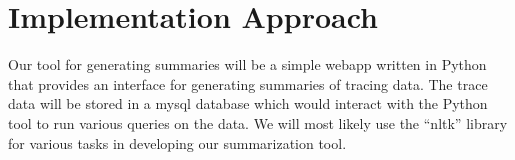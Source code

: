\section{Implementation Approach}

Our tool for generating summaries will be a simple webapp written in Python that provides
an interface for generating summaries of tracing data. The trace data will be stored in
a mysql database which would interact with the Python tool to run various queries on the data.
We will most likely use the ``nltk'' library for various tasks in developing our summarization tool.